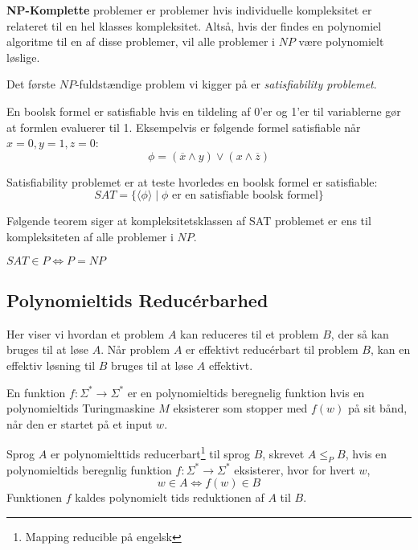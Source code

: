 
\textbf{NP-Komplette} problemer er problemer hvis individuelle kompleksitet er relateret til en hel klasses kompleksitet. Altså, hvis der findes en polynomiel algoritme til en af disse problemer, vil alle problemer i $NP$ være polynomielt løslige.

Det første $NP$-fuldstændige problem vi kigger på er \textit{satisfiability problemet}.

En boolsk formel er satisfiable hvis en tildeling af 0'er og 1'er til variablerne gør at formlen evaluerer til 1. Eksempelvis er følgende formel satisfiable når $x = 0, y = 1, z = 0$:
\begin{equation*}
	\phi = (\overline{x} \land y) \lor (x \land \overline{z})
\end{equation*}

Satisfiability problemet er at teste hvorledes en boolsk formel er satisfiable:
\begin{equation*}
	SAT = \{ \langle \phi \rangle \mid \phi \text{ er en satisfiable boolsk formel}\}
\end{equation*}

Følgende teorem siger at kompleksitetsklassen af SAT problemet er ens til kompleksiteten af alle problemer i $NP$.

\begin{theorem}
	$SAT \in P \iff P = NP$
\end{theorem}

\subsection{Polynomieltids Reducérbarhed}%
\label{subsec:polynomialreducibility}

Her viser vi hvordan et problem $A$ kan reduceres til et problem $B$, der så kan bruges til at løse $A$. Når problem $A$ er effektivt reducérbart til problem $B$, kan en effektiv løsning til $B$ bruges til at løse $A$ effektivt.

\begin{definition}
	En funktion $f : \Sigma^{*} \longrightarrow \Sigma^{*}$ er en polynomieltids beregnelig funktion hvis en polynomieltids Turingmaskine $M$ eksisterer som stopper med $f(w)$ på sit bånd, når den er startet på et input $w$.
\end{definition}

\begin{definition}
	Sprog $A$ er polynomielttids reducerbart\footnote{Mapping reducible på engelsk} til sprog $B$, skrevet $A \leq_{P} B$, hvis en polynomieltids beregnlig funktion $f : \Sigma^{*} \longrightarrow \Sigma^{*}$ eksisterer, hvor for hvert $w$,
	\begin{equation*}
		w \in A \iff f(w) \in B
	\end{equation*}
	Funktionen $f$ kaldes polynomielt tids reduktionen af $A$ til $B$.
\end{definition}

